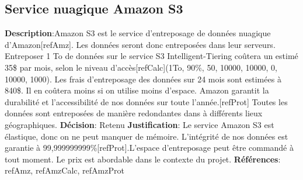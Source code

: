 

\subsection{Service nuagique Amazon S3}
\label{s:archiver_conc2}

\textbf{Description}:Amazon S3 est le service d'entreposage de données nuagique d’Amazon[refAmz]. Les données seront donc entreposées dans leur serveurs. Entreposer 1 To de données sur le service S3 Intelligent-Tiering coûtera un estimé 35\$ par mois, selon le niveau d’accès[refCalc](1To, 90\%, 50, 10000, 10000, 0, 10000, 1000).  Les frais d’entreposage des données sur 24 mois sont estimées à 840\$. Il en coûtera moins si on utilise moins d’espace. Amazon garantit la durabilité et l'accessibilité de nos données sur toute l’année.[refProt] Toutes les données sont entreposées de manière redondantes dans à différents lieux géographiques.
\textbf{Décision}: Retenu
\textbf{Justification}:  Le service Amazon S3 est élastique, donc on ne peut manquer de mémoire. L’intégrité de nos données est garantie à 99,999999999\%[refProt].L’espace d’entreposage peut être commandé à tout moment. Le prix est abordable dans le contexte du projet.
\textbf{Références}: 
refAmz, refAmzCalc, refAmzProt
